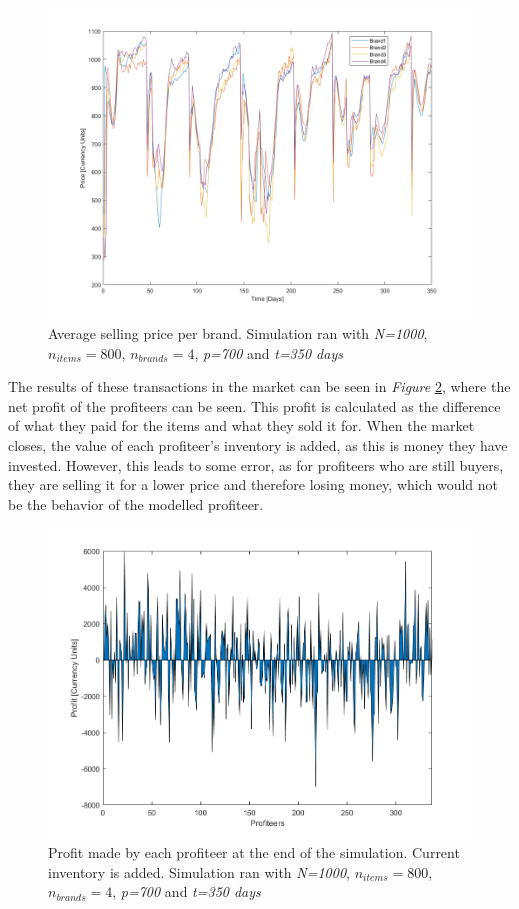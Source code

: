 \documentclass[12pt]{article}
\begin{document}
\begin{figure}
    \centering
    \includegraphics[width=0.6\columnwidth]{Nominal_Out/brndpnom.png}
    \caption{Average selling price per brand. Simulation ran with \textit{N=1000}, \textit{$n_{items}=800$}, \textit{$n_{brands}=4$}, \textit{p=700} and \textit{t=350 days}}
    \label{Avgbrnd_Nom}
\end{figure}

The results of these transactions in the market can be seen in \textit{Figure} \ref{profitnom}, where the net profit of the profiteers can be seen. This profit is calculated as the difference of what they paid for the items and what they sold it for. When the market closes, the value of each profiteer's inventory is added, as this is money they have invested. However, this leads to some error, as for profiteers who are still buyers, they are selling it for a lower price and therefore losing money, which would not be the behavior of the modelled profiteer. 

\begin{figure}
    \centering
    \includegraphics[width=0.6\columnwidth]{Nominal_Out/profit_nom.png}
    \caption{Profit made by each profiteer at the end of the simulation. Current inventory is added. Simulation ran with \textit{N=1000}, \textit{$n_{items}=800$}, \textit{$n_{brands}=4$}, \textit{p=700} and \textit{t=350 days}}
    \label{profitnom}
\end{figure}
\end{document}
